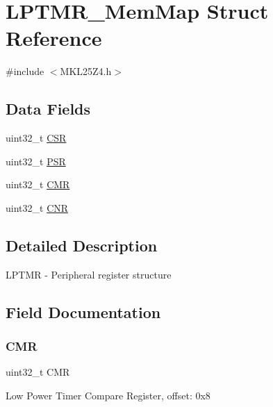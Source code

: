 \hypertarget{struct_l_p_t_m_r___mem_map}{}\section{L\+P\+T\+M\+R\+\_\+\+Mem\+Map Struct Reference}
\label{struct_l_p_t_m_r___mem_map}


{\ttfamily \#include $<$M\+K\+L25\+Z4.\+h$>$}

\subsection*{Data Fields}
\begin{DoxyCompactItemize}
\item 
uint32\+\_\+t \hyperlink{struct_l_p_t_m_r___mem_map_a9f762945117456968eec12c384b1b4e1}{C\+SR}
\item 
uint32\+\_\+t \hyperlink{struct_l_p_t_m_r___mem_map_a72127a2e703db8406742669d5cbd7f90}{P\+SR}
\item 
uint32\+\_\+t \hyperlink{struct_l_p_t_m_r___mem_map_aed876cad34a09b6c41e897664f2a1031}{C\+MR}
\item 
uint32\+\_\+t \hyperlink{struct_l_p_t_m_r___mem_map_a2077b5eef950a2fc28defcc74f06a6c0}{C\+NR}
\end{DoxyCompactItemize}


\subsection{Detailed Description}
L\+P\+T\+MR -\/ Peripheral register structure 

\subsection{Field Documentation}
\mbox{\label{struct_l_p_t_m_r___mem_map_aed876cad34a09b6c41e897664f2a1031}} 
\subsubsection{\texorpdfstring{C\+MR}{CMR}}
{\footnotesize\ttfamily uint32\+\_\+t C\+MR}

Low Power Timer Compare Register, offset\+: 0x8 \mbox{\label{struct_l_p_t_m_r___mem_map_a2077b5eef950a2fc28defcc74f06a6c0}} 
